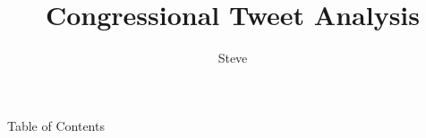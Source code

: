 \documentclass[handout]{beamer}
\title[Congressional Tweet Analysis]{Congressional Tweet Analysis}
\author[Steve Schluchter]{Steve\inst{1}}
\institute[SQL Anonymous :)]{  
\inst{1}%
  SQL Anonymous
}
\begin{document}
\frame{\titlepage}
\begin{frame}{Table of Contents}
	\tableofcontents
\end{frame}
%
%
%
%
%
\end{document}
